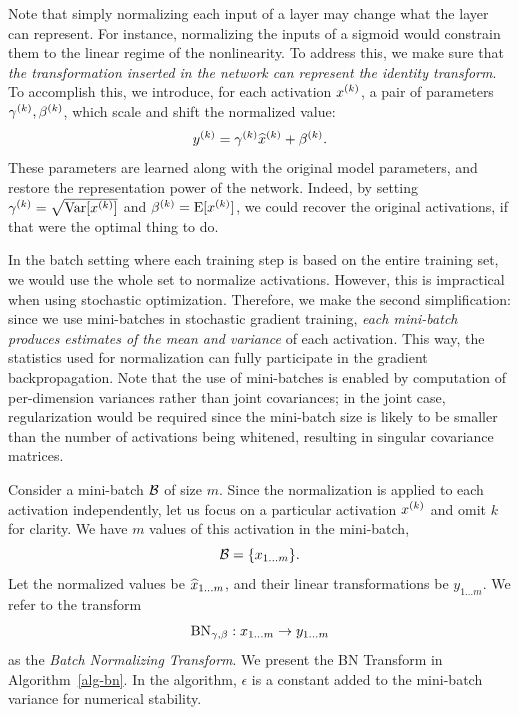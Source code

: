 \documentclass[twocolumn]{article}
\begin{document}
Note that simply normalizing each input of a layer may change what the
layer can represent. For instance, normalizing the inputs of a
sigmoid would constrain them to the linear
regime of the nonlinearity. To address this, we make sure that {\em the transformation inserted in
  the network can represent the identity transform}.  To
accomplish this, we introduce, for each activation $x^{(k)}$, a pair of
parameters $\gamma^{(k)}, \beta^{(k)}$, which scale and shift the
normalized value: $$y^{(k)} = \gamma^{(k)}\widehat{x}^{(k)} +
\beta^{(k)}.$$ These parameters are learned along with the original model
parameters, and restore the representation power of the
network. Indeed, by setting $\gamma^{(k)} = \sqrt{\text{Var}[x^{(k)}]}$ and
$\beta^{(k)} = \text{E}[x^{(k)}]$, we could recover the original activations, if that were the optimal thing to do.

In the batch setting where each training step is based on the entire training
set, we would use the whole set to normalize activations. However, this is
impractical when using stochastic optimization. Therefore, we make the second
simplification: since we use mini-batches in stochastic gradient training, {\em
  each mini-batch produces estimates of the mean and variance} of each
activation. This way, the statistics used for normalization can fully
participate in the gradient backpropagation.
Note that the use of mini-batches is enabled by computation of
per-dimension variances rather than joint covariances; in the joint case,
regularization would be required since the mini-batch size is likely to be
smaller than the number of activations being whitened, resulting in singular
covariance matrices.

Consider a mini-batch $\mathcal{B}$ of size $m$. Since the normalization is applied to
each activation independently, let us focus on a particular activation $x^{(k)}$ and omit $k$ for clarity. We have $m$ values of this activation
in the mini-batch,
$$\mathcal{B}=\{x_{1\ldots m}\}.$$ Let the normalized values be
$\widehat{x}_{1\ldots m}$, and their linear transformations be $y_{1\ldots m}$. We refer to the transform $$\text{BN}_{\gamma,\beta}: x_{1\ldots m}\rightarrow y_{1\ldots m}$$ as the {\em Batch Normalizing  Transform}.
  We present the BN Transform in Algorithm~\ref{alg-bn}.  In the algorithm, $\epsilon$ is a constant  added to the mini-batch variance for numerical stability.
\end{document}
